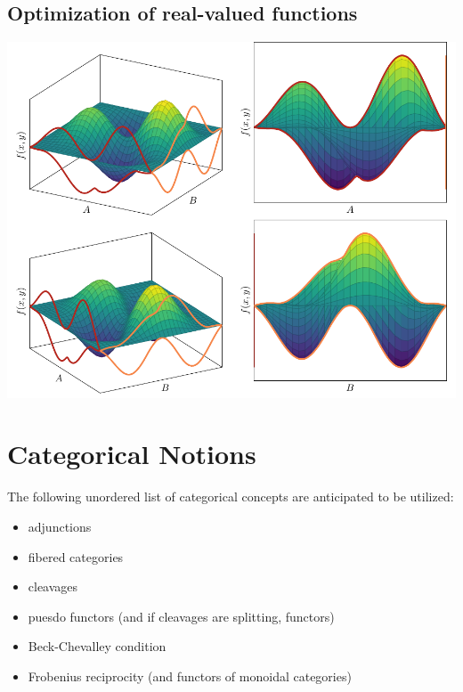 \documentclass[10pt]{article}
\theoremstyle{definition}
\theoremstyle{remark}
\begin{document}
\subsection{Optimization of real-valued functions}
\begin{center}
    \includegraphics[]{figures/min_max_multivariate_function/figure.pdf}
\end{center}

\clearpage

\section{Categorical Notions}

The following unordered list of categorical concepts are anticipated to be utilized:
\begin{itemize}
    \item adjunctions
    \item fibered categories
    \item cleavages
    \item puesdo functors (and if cleavages are splitting, functors)
    \item Beck-Chevalley condition
    \item Frobenius reciprocity (and functors of monoidal categories)
\end{itemize}
\end{document}
